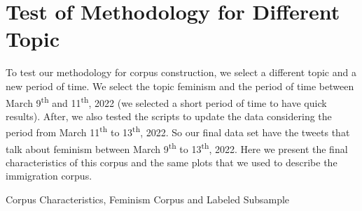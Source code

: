 \newpage
{}
    \renewcommand\thefigure{\thesection.\arabic{figure}} %
    \renewcommand{\thetable}{C.\arabic{table}} %
    \setcounter{figure}{0} %
    \setcounter{table}{0}


\section{Test of Methodology for Different Topic}\label{appsec_feminism}

To test our methodology for corpus construction, we select a different topic and a new period of time. We select the topic feminism and the period of time between March 9\textsuperscript{th} and 11\textsuperscript{th}, 2022 (we selected a short period of time to have quick results). After, we also tested the scripts to update the data considering the period from March 11\textsuperscript{th} to 13\textsuperscript{th}, 2022. So our final data set have the tweets that talk about feminism between March 9\textsuperscript{th} to 13\textsuperscript{th}, 2022. Here we present the final characteristics of this corpus and the same plots that we used to describe the immigration corpus. 

\begin{table}[H]
            \centering
            
            
            
            \caption{Corpus Characteristics, Feminism Corpus and Labeled Subsample}
            
            \label{tab_corpora_characs_feminism}
        \end{table}
        
